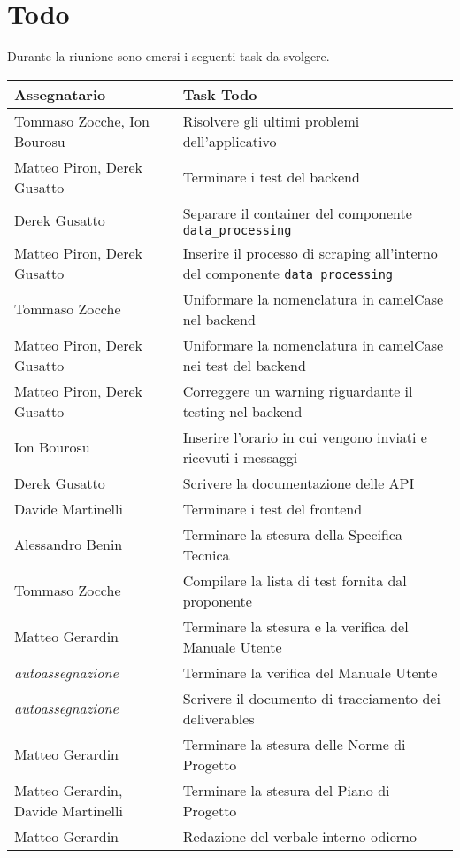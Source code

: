 \section{Todo}
Durante la riunione sono emersi i seguenti task da svolgere.

\begin{center}
  \begin{tabular}{|L{5cm}|L{8cm}|}
    \hline
    \textbf{Assegnatario} & \textbf{Task Todo} \\ \hline
        Tommaso Zocche, Ion Bourosu & Risolvere gli ultimi problemi dell’applicativo  \\ \hline
        Matteo Piron, Derek Gusatto & Terminare i test del backend \\ \hline
        Derek Gusatto & Separare il container del componente \texttt{data\_processing} \\ \hline
        Matteo Piron, Derek Gusatto & Inserire il processo di scraping all’interno del componente \texttt{data\_processing} \\ \hline
        Tommaso Zocche & Uniformare la nomenclatura in camelCase nel backend \\ \hline
        Matteo Piron, Derek Gusatto & Uniformare la nomenclatura in camelCase nei test del backend \\ \hline
        Matteo Piron, Derek Gusatto & Correggere un warning riguardante il testing nel backend \\ \hline
        Ion Bourosu & Inserire l’orario in cui vengono inviati e ricevuti i messaggi \\ \hline
        Derek Gusatto & Scrivere la documentazione delle API \\ \hline
        Davide Martinelli & Terminare i test del frontend \\ \hline
        Alessandro Benin & Terminare la stesura della Specifica Tecnica \\ \hline
        Tommaso Zocche & Compilare la lista di test fornita dal proponente \\ \hline
        Matteo Gerardin & Terminare la stesura e la verifica del Manuale Utente
        \\ \hline
        \textit{autoassegnazione} & Terminare la verifica del Manuale Utente \\ \hline
        \textit{autoassegnazione} & Scrivere il documento di tracciamento dei deliverables \\ \hline
        Matteo Gerardin & Terminare la stesura delle Norme di Progetto \\ \hline
        Matteo Gerardin, Davide Martinelli & Terminare la stesura del Piano di Progetto \\ \hline
        Matteo Gerardin & Redazione del verbale interno odierno \\ \hline
  \end{tabular}
\end{center}